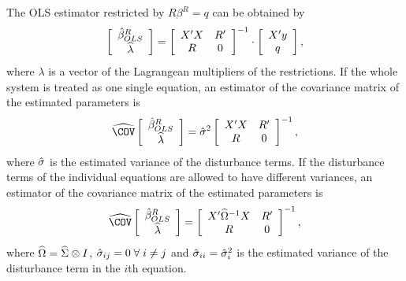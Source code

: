 The OLS estimator restricted by $R \beta^R = q$ can be obtained by
\begin{equation}
   \left[ \begin{array}{c}
      \hat{\beta}^R_{OLS} \\ \widehat{\lambda}
   \end{array} \right]
   =
   \left[ \begin{array}{cc}
      X' X & R' \\ 
      R & 0
   \end{array} \right]^{-1}
   \cdot
   \left[ \begin{array}{c}
      X' y \\ q 
   \end{array} \right] ,
\end{equation}
where $\lambda$ is a vector of the Lagrangean multipliers of the restrictions.
If the whole system is treated as one single equation,
an estimator of the covariance matrix of the estimated parameters is
\begin{equation}
   \COVHat
   \left[ \begin{array}{c}
      \bHat^R_{OLS} \\ \widehat{\lambda}
   \end{array} \right] 
   = \sHat^2 
   \left[ \begin{array}{cc}
      X' X & R' \\ 
      R & 0
   \end{array} \right]^{-1} ,
\end{equation}
where $\hat{\sigma}$ is the estimated variance of the disturbance terms.
If the disturbance terms of the individual equations
are allowed to have different variances, 
an estimator of the covariance matrix of the estimated parameters is
\begin{equation}
   \COVHat
   \left[ \begin{array}{c}
      \bHat^R_{OLS} \\ \widehat{\lambda}
   \end{array} \right] 
   = 
   \left[ \begin{array}{cc}
      X' \OHat^{-1} X & R' \\
      R & 0
   \end{array} \right]^{-1} ,
\end{equation}
where $\widehat{\Omega} = \widehat{\Sigma} \otimes I$,
$\hat{\sigma}_{ij} = 0 \; \forall \; i \neq j$ and
$\hat{\sigma}_{ii} = \hat{\sigma}_i^2$ is the estimated variance
of the disturbance term in the $i$th equation.

